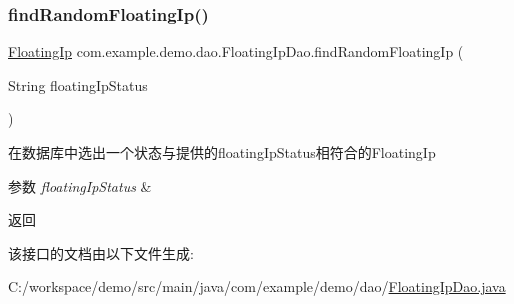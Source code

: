 \subsubsection{\texorpdfstring{find\+Random\+Floating\+Ip()}{findRandomFloatingIp()}}
{\footnotesize\ttfamily \mbox{\hyperlink{classcom_1_1example_1_1demo_1_1modular_1_1_floating_ip}{Floating\+Ip}} com.\+example.\+demo.\+dao.\+Floating\+Ip\+Dao.\+find\+Random\+Floating\+Ip (\begin{DoxyParamCaption}\item[{String}]{floating\+Ip\+Status }\end{DoxyParamCaption})}

在数据库中选出一个状态与提供的floating\+Ip\+Status相符合的\+Floating\+Ip 
\begin{DoxyParams}{参数}
{\em floating\+Ip\+Status} & \\
\hline
\end{DoxyParams}
\begin{DoxyReturn}{返回}

\end{DoxyReturn}


该接口的文档由以下文件生成\+:\begin{DoxyCompactItemize}
\item 
C\+:/workspace/demo/src/main/java/com/example/demo/dao/\mbox{\hyperlink{_floating_ip_dao_8java}{Floating\+Ip\+Dao.\+java}}\end{DoxyCompactItemize}
